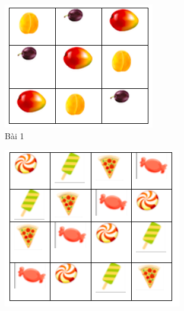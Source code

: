 \begin{multicols}{2}
	\begin{figure}[H]
		\centering
		\vspace*{-5pt}
		\captionsetup{labelformat= empty, justification=centering}
		\includegraphics[width=0.9\linewidth]{sudoku1.png}
		\caption{\small{Bài 1}}
		\vspace*{-10pt}
	\end{figure}
	\begin{figure}[H]
		\centering
		\vspace*{-5pt}
		\captionsetup{labelformat= empty, justification=centering}
		\includegraphics[width=0.9\linewidth]{sudoku2.png}

\end{figure}
\end{multicols}
